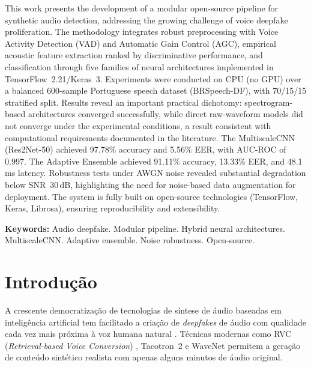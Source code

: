 \documentclass[12pt,a4paper]{article}
\begin{document}
\noindent
This work presents the development of a modular open-source pipeline for
synthetic audio detection, addressing the growing challenge of voice deepfake
proliferation.
The methodology integrates robust preprocessing with Voice Activity Detection
(VAD) and Automatic Gain Control (AGC), empirical acoustic feature extraction
ranked by discriminative performance, and classification through five families
of neural architectures implemented in TensorFlow~2.21/Keras~3.
Experiments were conducted on CPU (no GPU) over a balanced 600-sample
Portuguese speech dataset (BRSpeech-DF), with 70/15/15 stratified split.
Results reveal an important practical dichotomy: spectrogram-based architectures
converged successfully, while direct raw-waveform models did not converge
under the experimental conditions, a result consistent with computational
requirements documented in the literature.
The MultiscaleCNN (Res2Net-50) achieved 97.78\% accuracy and 5.56\% EER,
with AUC-ROC of 0.997.
The Adaptive Ensemble achieved 91.11\% accuracy, 13.33\% EER, and 48.1\,ms
latency.
Robustness tests under AWGN noise revealed substantial degradation below
SNR~30\,dB, highlighting the need for noise-based data augmentation for
deployment.
The system is fully built on open-source technologies (TensorFlow, Keras,
Librosa), ensuring reproducibility and extensibility.

\vspace{0.4cm}
\noindent\textbf{Keywords:} Audio deepfake. Modular pipeline.
Hybrid neural architectures. MultiscaleCNN. Adaptive ensemble.
Noise robustness. Open-source.

\newpage
\pagestyle{fancy}
\tableofcontents
\newpage

\section{Introdu\c{c}\~{a}o}

A crescente democratiza\c{c}\~{a}o de tecnologias de s\'{i}ntese de \'{a}udio
baseadas em intelig\^{e}ncia artificial tem facilitado a cria\c{c}\~{a}o de
\textit{deepfakes} de \'{a}udio com qualidade cada vez mais pr\'{o}xima \`{a}
voz humana natural \cite{muller2022warning, heidari2024deepfake}.
T\'{e}cnicas modernas como RVC (\textit{Retrieval-based Voice Conversion})
\cite{bird2023realtime}, Tacotron~2 \cite{shen2018natural} e WaveNet
\cite{oord2016wavenet} permitem a gera\c{c}\~{a}o de conte\'{u}do sint\'{e}tico
realista com apenas alguns minutos de \'{a}udio original.
\end{document}
